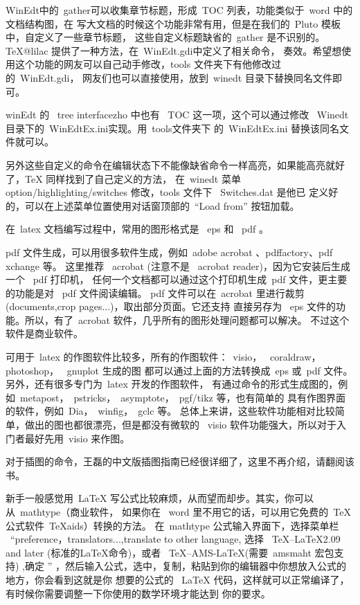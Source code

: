 WinEdt中的~gather可以收集章节标题，形成~TOC 列表，功能类似于~word 中的文档结构图，在
写大文档的时候这个功能非常有用，但是在我们的~Pluto 模板中，自定义了一些章节标题，
这些自定义标题缺省的~gather 是不识别的。TeX@lilac 提供了一种方法，在~WinEdt.gdi中定义了相关命令，
奏效。希望想使用这个功能的网友可以自己动手修改，tools 文件夹下有他修改过的~WinEdt.gdi，
网友们也可以直接使用，放到~winedt 目录下替换同名文件即可。

winEdt 的~ tree interfacezho 中也有~ TOC 这一项，这个可以通过修改 ~Winedt目录下的~WinEdtEx.ini实现。用~tools文件夹下
的~WinEdtEx.ini 替换该同名文件就可以。

另外这些自定义的命令在编辑状态下不能像缺省命令一样高亮，如果能高亮就好了，TeX 同样找到了自己定义的方法，
在~winedt 菜单~ option/highlighting/switches 修改，tools 文件下~ Switches.dat 是他已
定义好的，可以在上述菜单位置使用对话窗顶部的~``Load from'' 按钮加载。


在~latex 文档编写过程中，常用的图形格式是~ eps 和~ pdf 。

pdf 文件生成，可以用很多软件生成，例如~adobe acrobat 、pdffactory、pdf xchange 等。
这里推荐~ acrobat (注意不是~ acrobat  reader)，因为它安装后生成一个~ pdf 打印机，
任何一个文档都可以通过这个打印机生成~pdf 文件，更主要的功能是对~ pdf 文件阅读编辑。
pdf 文件可以在~acrobat 里进行裁剪~ (documents,crop pages...)，取出部分页面。它还支持
直接另存为~ eps 文件的功能。所以，有了~acrobat 软件，几乎所有的图形处理问题都可以解决。
不过这个软件是商业软件。

可用于~latex 的作图软件比较多，所有的作图软件：~visio，~ coraldraw，~ photoshop，~ gnuplot 生成的图
都可以通过上面的方法转换成~eps 或~pdf 文件。另外，还有很多专门为~latex 开发的作图软件，
有通过命令的形式生成图的，例如~metapost，~pstricks，~asymptote，~pgf/tikz 等，也有简单的
具有作图界面的软件，例如~Dia，~winfig，~gclc 等。  总体上来讲，这些软件功能相对比较简单，做出的图也都很漂亮，但是都没有微软的
~visio 软件功能强大，所以对于入门者最好先用~visio 来作图。

对于插图的命令，王磊的中文版插图指南已经很详细了，这里不再介绍，请翻阅该书。


新手一般感觉用~LaTeX 写公式比较麻烦，从而望而却步。其实，你可以从~mathtype（商业软件，
如果你在~ word 里不用它的话，可以用它免费的~TeX 公式软件~TeXaids）转换的方法。
在~mathtype 公式输入界面下，选择菜单栏 ~``preference，translators...,translate to other language,
选择~ TeX--LaTeX2.09 and later (标准的LaTeX命令)，或者~ TeX--AMS-LaTeX(需要~amsmaht 宏包支持) ,确定 ''
，然后输入公式，选中，复制，粘贴到你的编辑器中你想放入公式的地方，你会看到这就是你
想要的公式的~ LaTeX  代码，这样就可以正常编译了，有时候你需要调整一下你使用的数学环境才能达到
你的要求。

